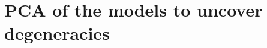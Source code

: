 \documentclass[onecolumn,galley]{mn2e}
\newcommand{\figref}[1] {Figure~\ref{#1}}
\newcommand\plotone[1]{%
 \centering
 \leavevmode
 \texttt{[image: \#1]}%
}%
\begin{document}
\section{PCA of the models to uncover degeneracies}


\appendix



%
%


\end{document}
